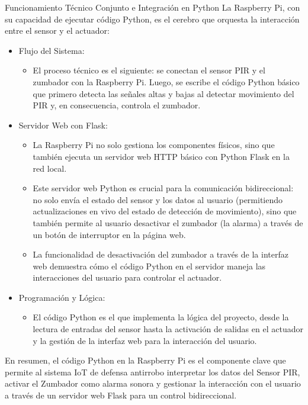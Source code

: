 \documentclass{report}
\begin{document}
Funcionamiento Técnico Conjunto e Integración en Python
La Raspberry Pi, con su capacidad de ejecutar código Python, es el cerebro que orquesta la interacción entre el sensor y el actuador:

\begin{itemize}
    \item Flujo del Sistema:
    \begin{itemize}
        \item El proceso técnico es el siguiente: se conectan el sensor PIR y el zumbador con la Raspberry Pi. 
        Luego, se escribe el código Python básico que primero detecta las señales altas y bajas al detectar movimiento del PIR y, en consecuencia, 
        controla el zumbador.
    \end{itemize}

    \item Servidor Web con Flask:
    \begin{itemize}
        \item La Raspberry Pi no solo gestiona los componentes físicos, sino que también ejecuta un servidor web HTTP 
        básico con Python Flask en la red local.
        \item Este servidor web Python es crucial para la comunicación bidireccional: no solo envía el estado del sensor y los datos al usuario 
        (permitiendo actualizaciones en vivo del estado de detección de movimiento), sino que también permite al usuario 
        desactivar el zumbador (la alarma) a través de un botón de interruptor en la página web.
        \item La funcionalidad de desactivación del zumbador a través de la interfaz web demuestra cómo el código Python en el 
        servidor maneja las interacciones del usuario para controlar el actuador.
    \end{itemize}

    \item Programación y Lógica: 
    \begin{itemize}
        \item El código Python es el que implementa la lógica del proyecto, desde la lectura de entradas del sensor 
        hasta la activación de salidas en el actuador y la gestión de la interfaz web para la interacción del usuario.
    \end{itemize}
\end{itemize}
En resumen, el código Python en la Raspberry Pi es el componente clave que permite al sistema IoT de defensa antirrobo interpretar los datos 
del Sensor PIR, activar el Zumbador como alarma sonora y gestionar la interacción con el usuario a través de un servidor web Flask para un 
control bidireccional.
\end{document}
